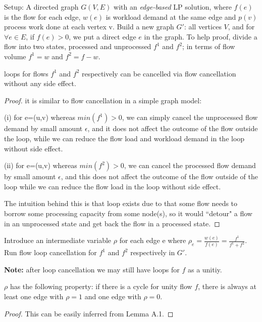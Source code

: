 Setup:
A directed graph $G(V,E)$ with an \emph{edge-based} LP solution, where $f(e)$ is the flow for each edge, $w(e)$ is workload demand at the same edge and $p(v)$ process work done at each vertex v. Build a new graph $G'$: all vertices $V$, and for $\forall e\in E $, if $f(e) >0$, we put a direct edge $e$ in the graph. To help proof, divide a flow into two states, processed and unprocessed $f^1$ and $f^2$; in terms of flow volume $f^1=w$ and $f^2=f-w$. 
\begin{lemma} loops for flows $f^1$ and $f^2$ respectively can be cancelled via flow cancellation without any side effect. 
\end{lemma} 

\begin{proof} it is similar to flow cancellation in a simple graph model: 

(i) for e=(u,v) whereas $min(f^1) >0$, we can simply cancel the unprocessed flow demand by small amount $\epsilon$, and it does not affect the outcome of the flow outside the loop, while we can reduce the flow load and workload demand in the loop without side effect. 

(ii) for e=(u,v) whereas $min(f^2)>0$, we can cancel the processed flow demand by small amount $\epsilon$, and this does not affect the outcome of the flow outside of the loop while we can reduce the flow load in the loop without side effect. 

The intuition behind this is that loop exists due to that some flow needs to borrow some processing capacity from some node(s), so it would ``detour" a flow in an unprocessed state and get back the flow in a processed state. 
\end{proof}

Introduce an intermediate variable $\rho$ for each edge e where $\rho_{e} = \frac{w(e)}{f(e)} = \frac{ f^1} {f^1+f^2 }$. Run flow loop cancellation for $f^1$ and $f^2$ respectively in $G'$.

\textbf{Note:} after loop cancellation we may still have loops for $f$ as a unitiy. 
\begin{lemma}
$\rho$ has the following property: if there is a cycle for unity flow $f$, there is always at least one edge with $\rho =1$ and one edge with $\rho =0$.
\end{lemma}
\begin{proof}
 This can be easily inferred from Lemma A.1.
\end{proof}



